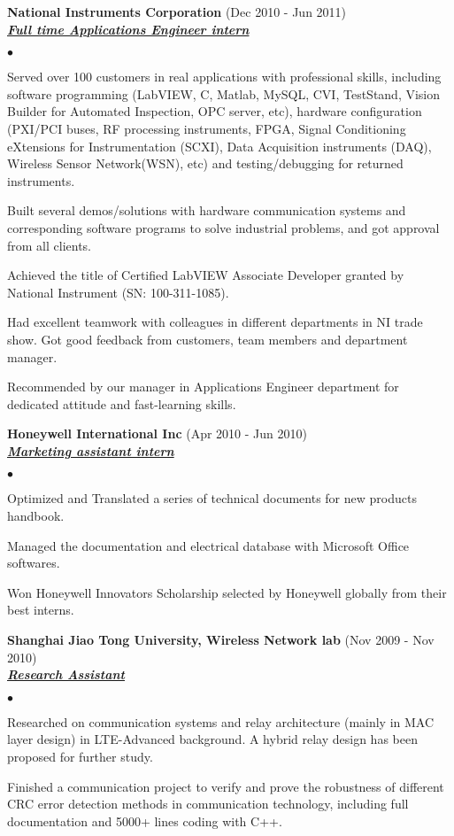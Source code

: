 \documentclass{article}
\newcommand{\employer}[3]{{ \textbf{#1} (#2)\\ \underline{\textbf{\emph{#3}}}\\  }}
\newenvironment{achievements}{\begin{list}{$\bullet$}{\topsep 0pt \itemsep -2pt}}{\vspace*{4pt}\end{list}}
\begin{document}
\employer{National Instruments Corporation}{Dec 2010 - Jun 2011}{Full time Applications Engineer intern}
	\begin{achievements}
	\item Served over 100 customers in real applications with professional skills, including software
	      programming (LabVIEW, C, Matlab, MySQL, CVI, TestStand, Vision Builder for Automated Inspection, OPC server, etc), hardware
	      configuration (PXI/PCI buses, RF processing instruments, FPGA, Signal Conditioning eXtensions for Instrumentation
	      (SCXI), Data Acquisition instruments (DAQ), Wireless Sensor Network(WSN), etc) and testing/debugging for returned instruments. 
	\item Built several demos/solutions with hardware communication systems and corresponding software programs to solve industrial problems, and got 			approval from all clients.
	\item Achieved the title of Certified LabVIEW Associate Developer granted by National Instrument (SN: 100-311-1085).
	\item Had excellent teamwork with colleagues in different departments in NI trade show. Got good feedback
	      from customers, team members and department manager.
	\item Recommended by our manager in Applications Engineer department for dedicated attitude and
	      fast-learning skills.

	\end{achievements}

\employer{Honeywell International Inc}{Apr 2010 - Jun 2010} {Marketing assistant intern}
	\begin{achievements}
	\item Optimized and Translated a series of technical documents for new products handbook.
	\item Managed the documentation and electrical database with Microsoft Office softwares.
	\item Won Honeywell Innovators Scholarship selected by Honeywell globally from their best interns. 
	
	\end{achievements}

\employer{Shanghai Jiao Tong University, Wireless Network lab}{Nov 2009 - Nov 2010}
	{Research Assistant}
	\begin{achievements}
	\item Researched on communication systems and relay architecture (mainly in MAC layer design) in LTE-Advanced
	      background. A hybrid relay design has been proposed for further study.
	\item Finished a communication project to verify and prove the robustness of different CRC error
	      detection methods in communication technology, including full documentation and 5000+ lines coding
	      with C++.
	\end{achievements}
\end{document}
